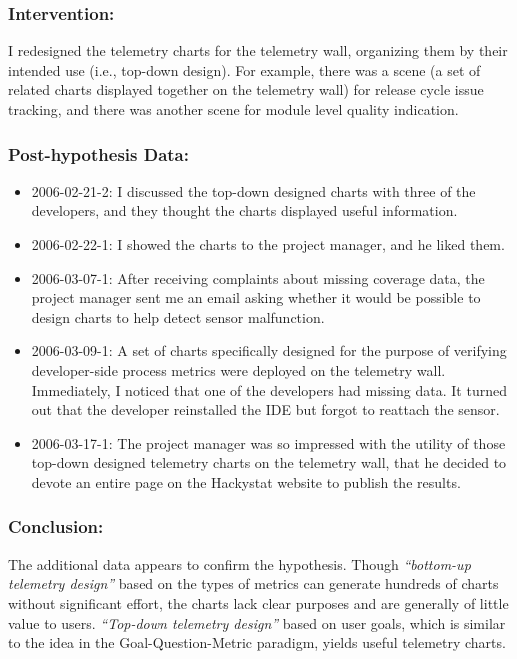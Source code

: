 \subsubsection{Intervention:}
I redesigned the telemetry charts for the telemetry wall, organizing them by their intended use (i.e., top-down design). For example, there was a scene (a set of related charts displayed together on the telemetry wall) for release cycle issue tracking, and there was another scene for module level quality indication.

\subsubsection{Post-hypothesis Data:}
\begin{itemize}
  \setlength{\itemsep}{0pt}
  \setlength{\parskip}{0pt}
  \item 2006-02-21-2: I discussed the top-down designed charts with three of the developers, and they thought the charts displayed useful information.
	\item 2006-02-22-1: I showed the charts to the project manager, and he liked them.
	\item 2006-03-07-1: After receiving complaints about missing coverage data, the project manager sent me an email asking whether it would be possible to design charts to help detect sensor malfunction.	
	\item 2006-03-09-1: A set of charts specifically designed for the purpose of verifying developer-side process metrics were deployed on the telemetry wall. Immediately, I noticed that one of the developers had missing data. It turned out that the developer reinstalled the IDE but forgot to reattach the sensor.
	\item 2006-03-17-1: The project manager was so impressed with the utility of those top-down designed telemetry charts on the telemetry wall, that he decided to devote an entire page on the Hackystat website to publish the results.
\end{itemize}

\subsubsection{Conclusion:}
The additional data appears to confirm the hypothesis. Though \textit{``bottom-up telemetry design''} based on the types of metrics can generate hundreds of charts without significant effort, the charts lack clear purposes and are generally of little value to users. \textit{``Top-down telemetry design''} based on user goals, which is similar to the idea in the Goal-Question-Metric paradigm, yields useful telemetry charts.

